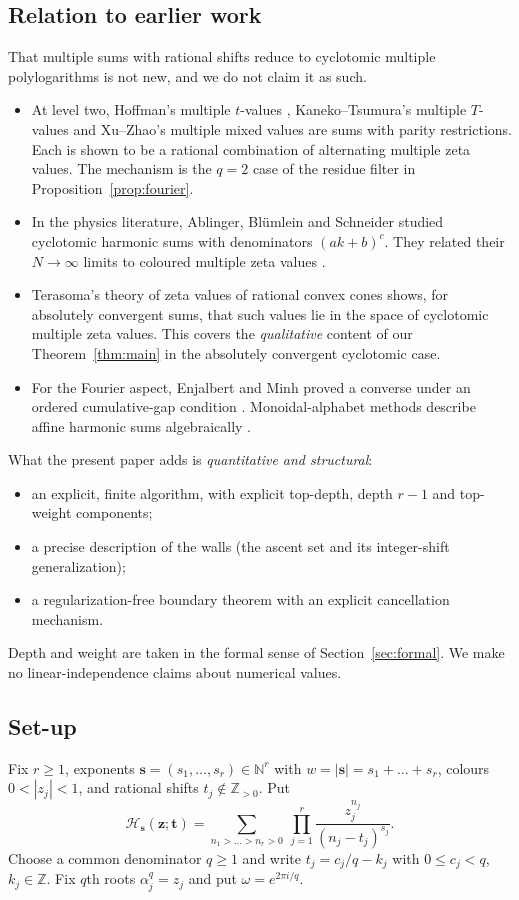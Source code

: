 \documentclass[11pt]{amsart}
\theoremstyle{definition}
\theoremstyle{remark}
\numberwithin{equation}{section}
\newcommand{\N}{\mathbb{N}}
\newcommand{\Z}{\mathbb{Z}}
\newcommand{\s}{\mathbf{s}}
\newcommand{\z}{\mathbf{z}}
\newcommand{\tb}{\mathbf{t}}
\newcommand{\Hs}{\mathcal{H}}
\begin{document}
\subsection*{Relation to earlier work}
That multiple sums with rational shifts reduce to cyclotomic multiple polylogarithms is not new, and we do not claim it as such.
\begin{itemize}[leftmargin=1.5em]
\item At level two, Hoffman's multiple $t$-values \cite{Hof19}, Kaneko--Tsumura's multiple $T$-values \cite{KT20} and Xu--Zhao's multiple mixed values \cite{XZ22} are sums with parity restrictions. Each is shown to be a rational combination of alternating multiple zeta values. The mechanism is the $q=2$ case of the residue filter in Proposition~\ref{prop:fourier}.
\item In the physics literature, Ablinger, Bl\"umlein and Schneider studied cyclotomic harmonic sums with denominators $(ak+b)^c$. They related their $N\to\infty$ limits to coloured multiple zeta values \cite{ABS11}.
\item Terasoma's theory of zeta values of rational convex cones \cite{Ter04} shows, for absolutely convergent sums, that such values lie in the space of cyclotomic multiple zeta values. This covers the \emph{qualitative} content of our Theorem~\ref{thm:main} in the absolutely convergent cyclotomic case.
\item For the Fourier aspect, Enjalbert and Minh proved a converse under an ordered cumulative-gap condition \cite[Prop.~3.4]{EM07}. Monoidal-alphabet methods describe affine harmonic sums algebraically \cite{Pha26}.
\end{itemize}
What the present paper adds is \emph{quantitative and structural}:
\begin{itemize}[leftmargin=1.5em]
\item an explicit, finite algorithm, with explicit top-depth, depth $r-1$ and top-weight components;
\item a precise description of the walls (the ascent set and its integer-shift generalization);
\item a regularization-free boundary theorem with an explicit cancellation mechanism.
\end{itemize}
Depth and weight are taken in the formal sense of Section~\ref{sec:formal}. We make no linear-independence claims about numerical values.

\subsection*{Set-up}
Fix $r\ge1$, exponents $\s=(s_1,\dots,s_r)\in\N^r$ with $w=|\s|=s_1+\dots+s_r$, colours $0<|z_j|<1$, and rational shifts $t_j\notin\Z_{>0}$. Put
\begin{equation}\label{eq:H}
\Hs_\s(\z;\tb)=\sum_{n_1>\dots>n_r>0}\ \prod_{j=1}^r\frac{z_j^{n_j}}{(n_j-t_j)^{s_j}} .
\end{equation}
Choose a common denominator $q\ge1$ and write $t_j=c_j/q-k_j$ with $0\le c_j<q$, $k_j\in\Z$. Fix $q$th roots $\alpha_j^q=z_j$ and put $\omega=e^{2\pi i/q}$.
\end{document}
